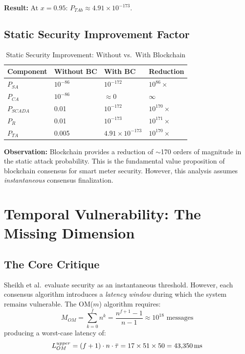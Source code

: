 \documentclass[10pt,twocolumn,letterpaper]{article}
\begin{document}
\textbf{Result:} At $x = 0.95$: $P_{TAb} \approx 4.91 \times 10^{-173}$.

\subsection{Static Security Improvement Factor}

\begin{table}[htbp]
\caption{Static Security Improvement: Without vs.\ With Blockchain}
\label{tab:static_improvement}
\centering
\scriptsize
\begin{tabular}{@{}llll@{}}
\toprule
\textbf{Component} & \textbf{Without BC} & \textbf{With BC} & \textbf{Reduction} \\
\midrule
$P_{SA}$ & $10^{-86}$ & $10^{-172}$ & $10^{86}\times$ \\
$P_{CA}$ & $10^{-86}$ & $\approx 0$ & $\infty$ \\
$P_{SCADA}$ & 0.01 & $10^{-172}$ & $10^{170}\times$ \\
$P_R$ & 0.01 & $10^{-173}$ & $10^{171}\times$ \\
\midrule
$P_{TA}$ & 0.005 & $4.91 \times 10^{-173}$ & $10^{170}\times$ \\
\bottomrule
\end{tabular}
\end{table}

\textbf{Observation:} Blockchain provides a reduction of $\sim$170 orders of magnitude in the static attack probability. This is the fundamental value proposition of blockchain consensus for smart meter security. However, this analysis assumes \emph{instantaneous} consensus finalization.

\section{Temporal Vulnerability: The Missing Dimension}
\label{sec:temporal}

\subsection{The Core Critique}

Sheikh et al.\ evaluate security as an instantaneous threshold. However, each consensus algorithm introduces a \emph{latency window} during which the system remains vulnerable. The OM($m$) algorithm requires:
\begin{equation}
M_{OM} = \sum_{k=0}^{f} n^k = \frac{n^{f+1}-1}{n-1} \approx 10^{18} \text{ messages}
\end{equation}
producing a worst-case latency of:
\begin{equation}
L_{OM}^{upper} = (f+1) \cdot n \cdot \bar{\tau} = 17 \times 51 \times 50 = 43{,}350\text{\,ms}
\end{equation}
\end{document}
